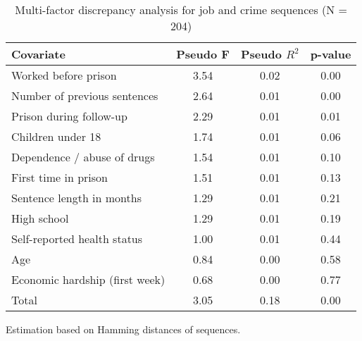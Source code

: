 \begin{table}[htp]
\footnotesize
\setlength{\tabcolsep}{10pt}
\renewcommand{\arraystretch}{1.3}
\begin{threeparttable}
\centering
\caption{Multi-factor discrepancy analysis for job and crime sequences (N = 204)} 
\label{tab:discrepancy_job_crime}
\begin{tabular}{lccc}
  \hline
Covariate & Pseudo F & Pseudo $R^2$ & p-value \\ 
  \hline
Worked before prison & 3.54 & 0.02 & 0.00 \\ 
  Number of previous sentences & 2.64 & 0.01 & 0.00 \\ 
  Prison during follow-up & 2.29 & 0.01 & 0.01 \\ 
  Children under 18 & 1.74 & 0.01 & 0.06 \\ 
  Dependence / abuse of drugs & 1.54 & 0.01 & 0.10 \\ 
  First time in prison & 1.51 & 0.01 & 0.13 \\ 
  Sentence length in months & 1.29 & 0.01 & 0.21 \\ 
  High school & 1.29 & 0.01 & 0.19 \\ 
  Self-reported health status & 1.00 & 0.01 & 0.44 \\ 
  Age & 0.84 & 0.00 & 0.58 \\ 
  Economic hardship (first week) & 0.68 & 0.00 & 0.77 \\ 
  Total & 3.05 & 0.18 & 0.00 \\ 
   \hline
\end{tabular}
\begin{tablenotes}
\scriptsize
\item Estimation based on Hamming distances of sequences.
\end{tablenotes}
\end{threeparttable}
\end{table}
